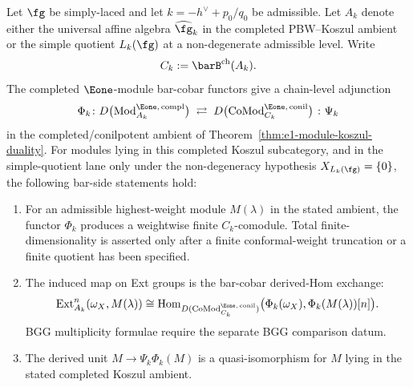 \begin{theorem}
\label{thm:kl-bar-cobar-adjunction}
Let $\fg$ be simply-laced and let $k = -h^\vee + p_0/q_0$ be admissible.
Let $A_k$ denote either the universal affine algebra
$\widehat{\fg}_k$ in the completed PBW--Koszul ambient or the simple
quotient $L_k(\fg)$ at a non-degenerate admissible level. Write
\[
 C_k := \barB^{\mathrm{ch}}(A_k).
\]
The completed $\Eone$-module bar-cobar functors give a chain-level
adjunction
\begin{equation}\label{eq:kl-bar-cobar-adjunction}
\Phi_k\colon
D\bigl(\mathrm{Mod}^{\Eone,\,\mathrm{compl}}_{A_k}\bigr)
\;\rightleftarrows\;
D\bigl(\mathrm{CoMod}^{\Eone,\,\mathrm{conil}}_{C_k}\bigr)
\;\colon \Psi_k
\end{equation}
in the completed/conilpotent ambient of
Theorem~\ref{thm:e1-module-koszul-duality}. For modules lying in this
completed Koszul subcategory, and in the simple-quotient lane only
under the non-degeneracy hypothesis $X_{L_k(\fg)}=\{0\}$, the
following bar-side statements hold:
\begin{enumerate}[label=\textup{(\roman*)}]
\item For an admissible highest-weight module $M(\lambda)$ in the
 stated ambient, the functor $\Phi_k$ produces a weightwise
 finite $C_k$-comodule. Total finite-dimensionality is asserted only
 after a finite conformal-weight truncation or a finite quotient has
 been specified.
\item The induced map on Ext groups is the bar-cobar derived-Hom
 exchange:
 \[
 \mathrm{Ext}^n_{A_k}(\omega_X, M(\lambda))
 \cong
 \operatorname{Hom}_{D(\mathrm{CoMod}^{\Eone,\,\mathrm{conil}}_{C_k})}
 \bigl(\Phi_k(\omega_X), \Phi_k(M(\lambda))[n]\bigr).
 \]
 BGG multiplicity formulae require the separate BGG comparison datum.
\item The derived unit
 $M\to\Psi_k\Phi_k(M)$ is a quasi-isomorphism for
 $M$ lying in the stated completed Koszul ambient.
\end{enumerate}
\end{theorem}

